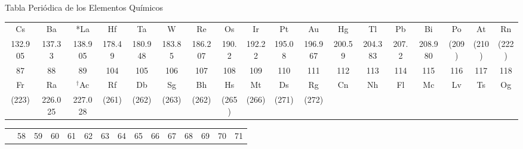 \begin{infocard}{Tabla Periódica de los Elementos Químicos}
\begin{center}
\begin{tabular}{|c*{16}{|c}|c|}
            Cs             & Ba             & *La            & Hf            & Ta             & W             & Re             & Os            & Ir             & Pt            & Au             & Hg            & Tl             & Pb             & Bi             & Po            & At             & Rn                                \\[-2mm]
            \small 132.905 & \small 137.33  & \small 138.905 & \small 178.49 & \small 180.948 & \small 183.85 & \small 186.207 & \small 190.2  & \small 192.22  & \small 195.08 & \small 196.967 & \small 200.59 & \small 204.383 & \small 207.2   & \small 208.980 & \small (209)  & \small (210)   & \small (222)                      \\
            \hline
            \small 87      & \small 88      & \small 89      & \small 104    & \small 105     & \small 106    & \small 107     & \small 108    & \small 109     & \small 110    & \small 111     & \small 112    & \small 113     & \small 114     & \small 115     & \small 116    & \small 117     & \small 118 \tabularnewline [-1mm]
            Fr             & Ra             & $^\dagger$Ac   & Rf            & Db             & Sg            & Bh             & Hs            & Mt             & Ds            & Rg             & Cn            & Nh             & Fl             & Mc             & Lv            & Ts             & Og\tabularnewline [-2mm]
            \small (223)   & \small 226.025 & \small 227.028 & \small (261)  & \small (262)   & \small (263)  & \small (262)   & \small (265)  & \small (266)   & \small (271)  & \small (272)   &               &                &                &                &               &                &                                   \\
        \end{tabular}
    \end{center}
    \vspace{0.5cm}
    \hspace{-0.2cm}
    \begin{tabular}{|p{3.5cm}|*{14}{c|}}
        \hline
                               & \small 58      & \small 59      & \small 60      & \small 61      & \small 62     & \small 63     & \small 64     & \small 65      & \small 66     & \small 67      & \small 68     & \small 69      & \small 70     & \small 71      \\[-1mm]

\end{tabular}
\end{infocard}
